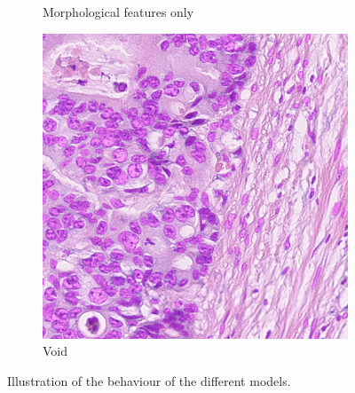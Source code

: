 \begin{figure}[H]
\begin{subfigure}[b]{0.45\textwidth}
    \caption{Morphological features only}
    \label{fig:consep-no-prior2}
  \end{subfigure}
  \hfill
  \begin{subfigure}[b]{0.45\textwidth}
    \includegraphics[width=\textwidth]{imgs/qual/consep/void2.png}
    \caption{Void}
    \label{fig:consep-void2}
  \end{subfigure}
  \caption{Illustration of the behaviour of the different models.}
  \label{fig:consep-qual2}
\end{figure}

\newpage

